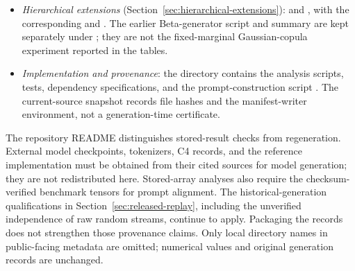 \documentclass[11pt]{article}
\begin{document}
\begin{itemize}
  \item \emph{Hierarchical extensions}
  (Section~\ref{sec:hierarchical-extensions}):
   and
  , with the corresponding
   and
  .  The earlier Beta-generator script
  and summary are kept separately under ; they are
  not the fixed-marginal Gaussian-copula experiment reported in the tables.

  \item \emph{Implementation and provenance}: the  directory
  contains the analysis scripts, tests, dependency specifications, and the
  prompt-construction script .
  The current-source snapshot  records file hashes and
  the manifest-writer environment, not a generation-time certificate.
\end{itemize}

The repository README distinguishes stored-result checks from regeneration.
External model checkpoints, tokenizers, C4 records, and the reference
implementation must be obtained from their cited sources for model generation;
they are not redistributed here.  Stored-array analyses also require the
checksum-verified benchmark tensors for prompt alignment.  The historical-generation qualifications in
Section~\ref{sec:released-replay}, including the unverified independence of raw
random streams, continue to apply.  Packaging the records does not strengthen
those provenance claims.  Only local directory names in public-facing metadata
are omitted; numerical values and original generation records are unchanged.
\par
\endgroup
\end{document}
